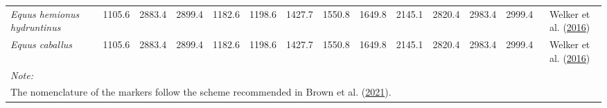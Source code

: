 \documentclass[
]{article}
\begin{document}
\begin{landscape}
\begin{table}
{\begin{tabular}[t]{>{}lccccccccccccc}
\em{Equus hemionus hydruntinus} & 1105.6 & 2883.4 & 2899.4 & 1182.6 & 1198.6 & 1427.7 & 1550.8 & 1649.8 & 2145.1 & 2820.4 & 2983.4 & 2999.4 & Welker et al. (\protect\hyperlink{ref-welkerfrido_etal16}{2016})\\
\em{Equus caballus} & 1105.6 & 2883.4 & 2899.4 & 1182.6 & 1198.6 & 1427.7 & 1550.8 & 1649.8 & 2145.1 & 2820.4 & 2983.4 & 2999.4 & Welker et al. (\protect\hyperlink{ref-welkerfrido_etal16}{2016})\\
\bottomrule
\multicolumn{14}{l}{\rule{0pt}{1em}\textit{Note: }}\\
\multicolumn{14}{l}{\rule{0pt}{1em}The nomenclature of the markers follow the scheme recommended in Brown et al. (\protect\hyperlink{ref-brown_etal21}{2021}).}\\
\end{tabular}}
\end{table}
\end{landscape}

\hfill\break





\begin{table}

\caption{\label{tab:si2tablep1} Number of proteins in proteome search and coverage of collagen for confirmation search digested with chymotrypsin.}
\end{table}
\end{document}
